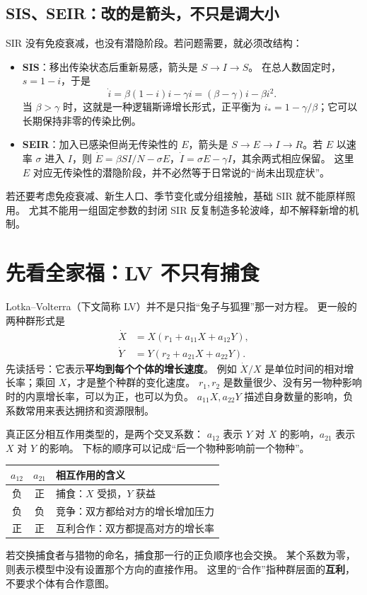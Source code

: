 \documentclass[UTF8,11pt,fontset=none]{ctexart}
\begin{document}
\subsection{SIS、SEIR：改的是箭头，不只是调大小}
SIR 没有免疫衰减，也没有潜隐阶段。若问题需要，就必须改结构：
\begin{itemize}
\item \textbf{SIS}：移出传染状态后重新易感，箭头是 $S\to I\to S$。
在总人数固定时，$s=1-i$，于是
\[
\dot i=\beta(1-i)i-\gamma i=(\beta-\gamma)i-\beta i^2.
\]
当 $\beta>\gamma$ 时，这就是一种逻辑斯谛增长形式，正平衡为
$i_*=1-\gamma/\beta$；它可以长期保持非零的传染比例。
\item \textbf{SEIR}：加入已感染但尚无传染性的 $E$，箭头是
$S\to E\to I\to R$。若 $E$ 以速率 $\sigma$ 进入 $I$，则
$\dot E=\beta SI/N-\sigma E$，$\dot I=\sigma E-\gamma I$，其余两式相应保留。
这里 $E$ 对应无传染性的潜隐阶段，并不必然等于日常说的“尚未出现症状”。
\end{itemize}
若还要考虑免疫衰减、新生人口、季节变化或分组接触，基础 SIR 就不能原样照用。
尤其不能用一组固定参数的封闭 SIR 反复制造多轮波峰，却不解释新增的机制。

\section{先看全家福：LV 不只有捕食}
Lotka--Volterra（下文简称 LV）并不是只指“兔子与狐狸”那一对方程。
更一般的两种群形式是
\begin{equation}\label{eq:general-lv}
\boxed{\begin{aligned}
\dot X&=X(r_1+a_{11}X+a_{12}Y),\\
\dot Y&=Y(r_2+a_{21}X+a_{22}Y).
\end{aligned}}
\end{equation}
先读括号：它表示\textbf{平均到每个个体的增长速度}。
例如 $\dot X/X$ 是单位时间的相对增长率；乘回 $X$，才是整个种群的变化速度。
$r_1,r_2$ 是数量很少、没有另一物种影响时的内禀增长率，可以为正，也可以为负。
$a_{11}X,a_{22}Y$ 描述自身数量的影响，负系数常用来表达拥挤和资源限制。

真正区分相互作用类型的，是两个交叉系数：
$a_{12}$ 表示 $Y$ 对 $X$ 的影响，$a_{21}$ 表示 $X$ 对 $Y$ 的影响。
下标的顺序可以记成“后一个物种影响前一个物种”。
\begin{center}
\begin{tabular}{ccp{8.4cm}}
\toprule
$a_{12}$ & $a_{21}$ & 相互作用的含义\\\midrule
负 & 正 & 捕食：$X$ 受损，$Y$ 获益\\
负 & 负 & 竞争：双方都给对方的增长增加压力\\
正 & 正 & 互利合作：双方都提高对方的增长率\\\bottomrule
\end{tabular}
\end{center}
若交换捕食者与猎物的命名，捕食那一行的正负顺序也会交换。
某个系数为零，则表示模型中没有设置那个方向的直接作用。
这里的“合作”指种群层面的\textbf{互利}，不要求个体有合作意图。
\end{document}
